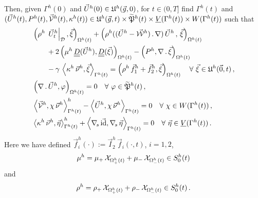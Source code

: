 Then, given $\Gamma^h(0)$ and $\vec U^h(0)\in \uspacesemidiscale{g}{h}{0}$, for
$t\in (0,T]$ find $\Gamma^h(t)$ and $(\vec U^h(t), P^h(t),
\V^h(t), \kappa^h(t)) \in \uspacesemidiscale{g}{h}{t} \times \pnormspaceale^h(t)
\times \Vht \times \Wht$ such that
\begin{subequations}
\begin{align}
& \left(\rho^h\,\left.\vec U^h_t\right|_{\D}, \vec \xi \right)_{\Omega^h(t)} +
\left(\rho^h((\vec U^h-\W^h)\,.\,\nabla)\,\vec U^h\,,
\,\vec \xi \right)_{\Omega^h(t)} \nonumber \\
& \qquad +2\left(\mu^h\,\mat D(\vec U^h), \mat D(\vec \xi) \right)_{\Omega^h(t)}
- \left(P^h, \nabla\,.\,\vec \xi\right)_{\Omega^h(t)} \nonumber \\
& \qquad - \gamma\,\left\langle \kappa^h\,\vec\nu^h,
\vec\xi\right\rangle_{\Gamma^h(t)} =
\left(\rho^h\,\vec f_1^h+\vec f_2^h, \vec \xi\right)_{\Omega^h(t)}
\quad \forall\ \vec\xi \in \uspacesemidiscale{0}{h}{t}\,,
\label{eq:ns_semi_alea}\\
& \left(\nabla\,.\,\vec U^h, \varphi\right)_{\Omega^h(t)}  = 0
\quad \forall\ \varphi \in \pnormspaceale^h(t)\,, \label{eq:ns_semi_aleb} \\
& \left\langle \V^h , \chi\,\vec\nu^h
\right\rangle_{\Gamma^h(t)}^h - \left\langle \vec U^h, \chi\,\vec\nu^h
\right\rangle_{\Gamma^h(t)} = 0 \quad \forall\ \chi \in \Wht\,,
\label{eq:ns_semi_alec} \\
& \left\langle \kappa^h\,\vec\nu^h, \vec\eta \right\rangle_{\Gamma^h(t)}^h
+ \left\langle \nabs\,\vec\id, \nabs\,\vec \eta \right\rangle_{\Gamma^h(t)} = 0
\quad \forall\ \vec\eta \in \Vht\,. \label{eq:ns_semi_aled}
\end{align}
\end{subequations}
Here we have defined
$\vec f_i^h(\cdot) := \vec I^h_2\,\vec f_i(\cdot,t)$, $i=1,2$,
\begin{equation}
\mu^h = \mu_+\,\charfcn{\Omega^h_+(t)} + \mu_-\,\charfcn{\Omega^h_-(t)}\in
S^h_0(t)
\end{equation}
and
\begin{equation}
\rho^h = \rho_+\,\charfcn{\Omega^h_+(t)} + \rho_-\,\charfcn{\Omega^h_-(t)}\in
S^h_0(t)\,.
\end{equation}

